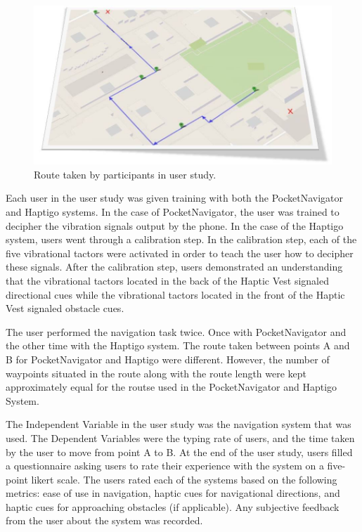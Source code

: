 \documentclass{sigchi}
\begin{document}
\begin{figure}[ht]
\centering
\includegraphics[width=0.8\columnwidth]{Images/UserStudyRoute.JPG}
\caption{Route taken by participants in user study.}
\label{figure:userstudy:route}
\end{figure}

Each user in the user study was given training with both the PocketNavigator\cite{2010_Pielot_MobileHCI} and Haptigo systems. In the case of PocketNavigator\cite{2010_Pielot_MobileHCI}, the user was trained to decipher the vibration signals output by the phone. In the case of the Haptigo system, users went through a calibration step. In the calibration step, each of the five vibrational tactors were activated in order to teach the user how to decipher these signals. After the calibration step, users demonstrated an understanding that the vibrational tactors located in the back of the Haptic Vest signaled directional cues while the  vibrational tactors located in the front of the Haptic Vest signaled obstacle cues.

The user performed the navigation task twice. Once with PocketNavigator\cite{2010_Pielot_MobileHCI} and the other time with the Haptigo system. The route taken between points A and B for PocketNavigator\cite{2010_Pielot_MobileHCI} and Haptigo were different. However, the number of waypoints situated in the route along with the route length were kept approximately equal for the routse used in the PocketNavigator\cite{2010_Pielot_MobileHCI} and Haptigo System.

The Independent Variable in the user study was the navigation system that was used. The Dependent Variables were the typing rate of users, and the time taken by the user to move from point A to B. At the end of the user study,  users filled a questionnaire asking users to rate their experience with the system on a five-point likert scale. The users rated each of the systems based on the following metrics: ease of use in navigation, haptic cues for navigational directions, and haptic cues for approaching obstacles (if applicable). Any subjective feedback from the user about the system was recorded.
\end{document}
